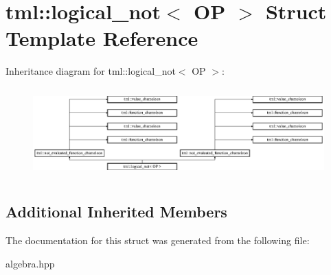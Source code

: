 \hypertarget{structtml_1_1logical__not}{\section{tml\+:\+:logical\+\_\+not$<$ O\+P $>$ Struct Template Reference}
\label{structtml_1_1logical__not}
}
Inheritance diagram for tml\+:\+:logical\+\_\+not$<$ O\+P $>$\+:\begin{figure}[H]
\begin{center}
\leavevmode
\includegraphics[height=3.500000cm]{structtml_1_1logical__not}
\end{center}
\end{figure}
\subsection*{Additional Inherited Members}


The documentation for this struct was generated from the following file\+:\begin{DoxyCompactItemize}
\item 
algebra.\+hpp\end{DoxyCompactItemize}
